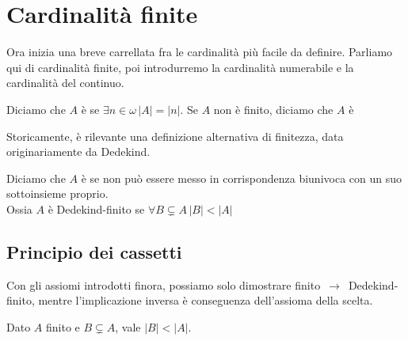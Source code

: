 \section{Cardinalit\`a finite}
Ora inizia una breve carrellata fra le cardinalit\`a pi\`u facile da definire. Parliamo qui di cardinalit\`a finite, poi introdurremo la cardinalit\`a numerabile e la cardinalit\`a del continuo.

\begin{definition}
	Diciamo che $A$ \`e  se $\exists {n \in \omega} \, |A| = |n|$. Se $A$ non \`e finito, diciamo che $A$ \`e 
\end{definition}

Storicamente, \`e rilevante una definizione alternativa di finitezza, data originariamente da Dedekind.

\begin{definition}
	Diciamo che $A$ \`e  se {\drkred non} pu\`o
essere messo in corrispondenza biunivoca con un suo sottoinsieme
proprio.\\
{\drkgrn Ossia $A$ \`e Dedekind-finito se $\forall {B \subsetneq A} \, |B|
< |A|$}
\end{definition}

\subsection{Principio dei cassetti}

Con gli assiomi introdotti finora, possiamo solo dimostrare finito~$\rightarrow$~Dedekind-finito, mentre l'implicazione inversa \`e conseguenza dell'assioma della scelta.

\begin{proposition}
	\label{cassetti}
	Dato $A$ finito e $B \subsetneq A$, vale $|B| < |A|$. 
\end{proposition}

